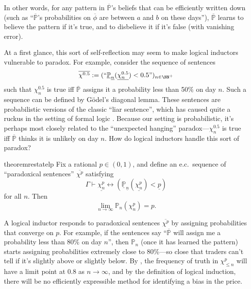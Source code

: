 \documentclass[authordate,onecolumn,noenvironments]{miri-tech-article}
\numberwithin{equation}{subsection}
\renewcommand{\iff}{\leftrightarrow}
\newcommand{\quot}[1]{``#1"}
\newcommand{\enc}[1]{{\underline{#1}}}
\newcommand{\seq}[1]{{\overline{#1}}}
\newcommand{\prob}{p}
\newcommand{\nn}{n}
\newcommand{\phis}{\seq{\phi}}
\newcommand{\ec}[1][\ ]{e.c.#1}
\newcommand{\li}{logical inductor}
\newcommand{\rparenthetical}[1]{\hfill\upshape{{\small (#1)}}} %
\newcommand{\proofin}[1]{\rparenthetical{Proof in:~#1.}}
\newcommand{\BelState}{\mathbb{P}}
\newcommand{\pt}{\BelState}
\newcommand{\MP}{\seq{\pt}}
\newcommand{\Theory}{\Gamma}
\begin{document}
\noindent In other words, for any pattern in $\MP$'s beliefs that can be efficiently written down (such as ``$\MP$'s probabilities on $\phis$ are between $a$ and $b$ on these days''), $\MP$ learns to believe the pattern if it's true, and to disbelieve it if it's false (with vanishing error).

At a first glance, this sort of self-reflection may seem to make \li{}s vulnerable to paradox. For example, consider the sequence of sentences
\[
  \seq{\chi^{0.5}} := (\quot{{\enc{\pt}_{\enc{\nn}}}(\enc{\chi^{0.5}_\nn}) < 0.5})_{\nn\in {\NN^+}}
\]
such that $\chi^{0.5}_\nn$ is true iff $\MP$ assigns it a probability less than 50\% on day $\nn$. Such a sequence can be defined by G\"odel's diagonal lemma. These sentences are probabilistic versions of the classic ``liar sentence'', which has caused quite a ruckus in the setting of formal logic \citep{grim1991incomplete,mcgee1990truth,glanzberg2001liar,gupta1993revision,eklund2002inconsistent}. Because our setting is probabilistic, it's perhaps most closely related to the ``unexpected hanging'' paradox---$\chi^{0.5}_\nn$ is true iff $\MP$ thinks it is unlikely on day $\nn$. How do logical inductors handle this sort of paradox?

\begin{restatable}{theorem}{restatelp}\label{thm:lp}
  Fix a rational $\prob\in(0,1)$, and define an \ec sequence of ``paradoxical sentences'' $\seq{\chi^\prob}$ satisfying
  \[
    \Theory \vdash{{\enc{\chi^\prob_\nn}} \iff \left(
      {\enc{\pt}_{\enc{\nn}}}({\enc{\chi^\prob_\nn}}) < \enc{\prob}
    \right)}
  \]
  for all $\nn$. Then
  \[
    \lim_{\nn\to\infty}\pt_\nn(\chi^\prob_\nn)=\prob.
  \]
  \proofin{\ref{app:lp}}
\end{restatable}

\noindent A logical inductor responds to paradoxical sentences $\seq{\chi^\prob}$ by assigning probabilities that converge on $\prob$. For example, if the sentences say ``$\MP$ will assign me a probability less than 80\% on day $\nn$'', then $\pt_\nn$ (once it has learned the pattern) starts assigning probabilities extremely close to 80\%---so close that traders can't tell if it's slightly above or slightly below. By , the frequency of truth in $\chi^\prob_{\leq \nn}$ will have a limit point at 0.8 as $n \to \infty$, and by the definition of logical induction, there will be no efficiently expressible method for identifying a bias in the price.
\end{document}
